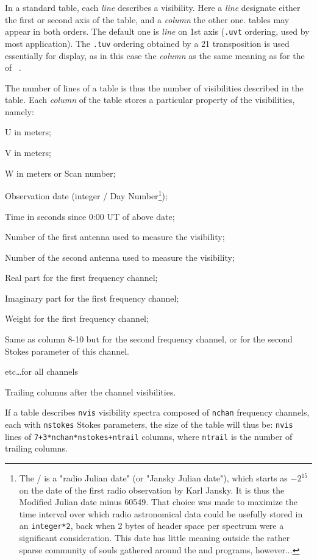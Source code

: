 In a standard \uv{} table, each \textit{line} describes a visibility. 
Here a \textit{line} designate either the first or second axis of the 
table, and a \textit{column} the other one. \uv{} tables may appear in 
both orders. The default one is \textit{line} on 1st axis (\texttt{.uvt} 
ordering, used by most application). The \texttt{.tuv} ordering 
obtained by a 21 transposition is used essentially for display, as in 
this case the \textit{column} as the same meaning as for the 
 of \greg\ .

The number of lines of a \uv{} table is thus the number of visibilities described
in the table. Each \textit{column} of the table stores a particular property of the
visibilities, namely:
\begin{description}\itemsep 0pt
\item[Column 1] U in meters;
\item[Column 2] V in meters;
\item[Column 3] W in meters or Scan number;
\item[Column 4] Observation date (integer \class{}/\clic{} Day
  Number\footnote{The \class{}/\clic{} is a "radio Julian date" (or "Jansky
    Julian date"), which starts as $-2^{15}$ on the date of the first radio
    observation by Karl Jansky. It is thus the Modified Julian date minus
    60549.  That choice was made to maximize the time interval over which
    radio astronomical data could be usefully stored in an
    \texttt{integer*2}, back when 2 bytes of header space per spectrum were
    a significant consideration.  This date has little meaning outside the
    rather sparse community of souls gathered around the \class{} and
    \clic{} programs, however...});
\item[Column 5] Time in seconds since 0:00 UT of above date;
\item[Column 6] Number of the first antenna used to measure the visibility;
\item[Column 7] Number of the second antenna used to measure the visibility;
\item[Column 8] Real part for the first frequency channel;
\item[Column 9] Imaginary part for the first frequency channel;
\item[Column 10] Weight for the first frequency channel;
\item[Columns 11-13] Same as column 8-10 but for the second frequency
  channel, or for the second Stokes parameter of this channel.
\item[...] etc\ldots for all channels
\item[Columns N-ntrail+1 ... N] Trailing columns after the channel visibilities.
\end{description}
If a \uv{} table describes \texttt{nvis} visibility spectra composed of
\texttt{nchan} frequency channels, each with \texttt{nstokes} Stokes parameters,
the size of the table will thus be:
\texttt{nvis} lines of \texttt{7+3*nchan*nstokes+ntrail} columns, where \texttt{ntrail}
is the number of trailing columns.

